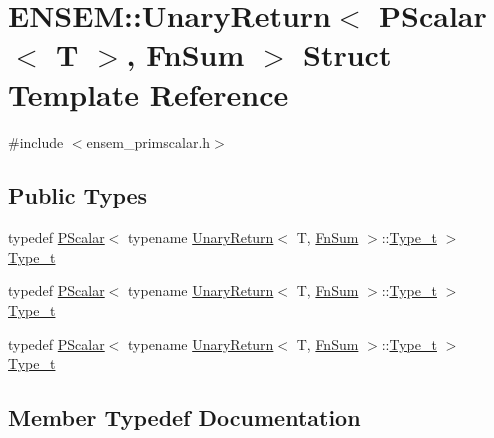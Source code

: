 \hypertarget{structENSEM_1_1UnaryReturn_3_01PScalar_3_01T_01_4_00_01FnSum_01_4}{}\section{E\+N\+S\+EM\+:\+:Unary\+Return$<$ P\+Scalar$<$ T $>$, Fn\+Sum $>$ Struct Template Reference}
\label{structENSEM_1_1UnaryReturn_3_01PScalar_3_01T_01_4_00_01FnSum_01_4}


{\ttfamily \#include $<$ensem\+\_\+primscalar.\+h$>$}

\subsection*{Public Types}
\begin{DoxyCompactItemize}
\item 
typedef \mbox{\hyperlink{classENSEM_1_1PScalar}{P\+Scalar}}$<$ typename \mbox{\hyperlink{structENSEM_1_1UnaryReturn}{Unary\+Return}}$<$ T, \mbox{\hyperlink{structENSEM_1_1FnSum}{Fn\+Sum}} $>$\+::\mbox{\hyperlink{structENSEM_1_1UnaryReturn_3_01PScalar_3_01T_01_4_00_01FnSum_01_4_abc54c8d313930663db099556679c774a}{Type\+\_\+t}} $>$ \mbox{\hyperlink{structENSEM_1_1UnaryReturn_3_01PScalar_3_01T_01_4_00_01FnSum_01_4_abc54c8d313930663db099556679c774a}{Type\+\_\+t}}
\item 
typedef \mbox{\hyperlink{classENSEM_1_1PScalar}{P\+Scalar}}$<$ typename \mbox{\hyperlink{structENSEM_1_1UnaryReturn}{Unary\+Return}}$<$ T, \mbox{\hyperlink{structENSEM_1_1FnSum}{Fn\+Sum}} $>$\+::\mbox{\hyperlink{structENSEM_1_1UnaryReturn_3_01PScalar_3_01T_01_4_00_01FnSum_01_4_abc54c8d313930663db099556679c774a}{Type\+\_\+t}} $>$ \mbox{\hyperlink{structENSEM_1_1UnaryReturn_3_01PScalar_3_01T_01_4_00_01FnSum_01_4_abc54c8d313930663db099556679c774a}{Type\+\_\+t}}
\item 
typedef \mbox{\hyperlink{classENSEM_1_1PScalar}{P\+Scalar}}$<$ typename \mbox{\hyperlink{structENSEM_1_1UnaryReturn}{Unary\+Return}}$<$ T, \mbox{\hyperlink{structENSEM_1_1FnSum}{Fn\+Sum}} $>$\+::\mbox{\hyperlink{structENSEM_1_1UnaryReturn_3_01PScalar_3_01T_01_4_00_01FnSum_01_4_abc54c8d313930663db099556679c774a}{Type\+\_\+t}} $>$ \mbox{\hyperlink{structENSEM_1_1UnaryReturn_3_01PScalar_3_01T_01_4_00_01FnSum_01_4_abc54c8d313930663db099556679c774a}{Type\+\_\+t}}
\end{DoxyCompactItemize}


\subsection{Member Typedef Documentation}
\mbox{\label{structENSEM_1_1UnaryReturn_3_01PScalar_3_01T_01_4_00_01FnSum_01_4_abc54c8d313930663db099556679c774a}} 
